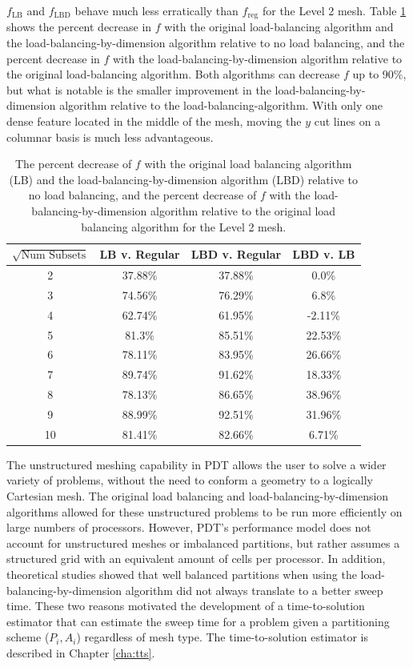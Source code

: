 $f_\text{LB}$ and $f_\text{LBD}$ behave much less erratically than $f_\text{reg}$ for the Level 2 mesh.
Table \ref{level2_metric_improvement} shows the percent decrease in $f$ with the original load-balancing algorithm and the load-balancing-by-dimension algorithm relative to no load balancing, and the percent decrease in $f$ with the load-balancing-by-dimension algorithm relative to the original load-balancing algorithm.
Both algorithms can decrease $f$ up to 90\%, but what is notable is the smaller improvement in the load-balancing-by-dimension algorithm relative to the load-balancing-algorithm.
With only one dense feature located in the middle of the mesh, moving the $y$ cut lines on a columnar basis is much less advantageous.
\begin{table}[ht]
\centering
\caption{The percent decrease of $f$ with the original load balancing algorithm (LB) and the load-balancing-by-dimension algorithm (LBD) relative to no load balancing, and the percent decrease of $f$ with the load-balancing-by-dimension algorithm relative to the original load balancing algorithm for the Level 2 mesh.}
\label{level2_metric_improvement}
\begin{tabular}{c|c|c|c}
\textbf{$\sqrt{\text{Num Subsets}}$} & \bf LB v. Regular  & \bf LBD v. Regular & \bf LBD v. LB \\ \hline
2&37.88\%&37.88\%&0.0\%\\ \hline
3&74.56\%&76.29\%&6.8\%\\ \hline
4&62.74\%&61.95\%&-2.11\%\\ \hline
5&81.3\%&85.51\%&22.53\%\\ \hline
6&78.11\%&83.95\%&26.66\%\\ \hline
7&89.74\%&91.62\%&18.33\%\\ \hline
8&78.13\%&86.65\%&38.96\%\\ \hline
9&88.99\%&92.51\%&31.96\%\\ \hline
10&81.41\%&82.66\%&6.71\%
\end{tabular}
\end{table}

\FloatBarrier
The unstructured meshing capability in PDT allows the user to solve a wider variety of problems, without the need to conform a geometry to a logically Cartesian mesh.
The original load balancing and load-balancing-by-dimension algorithms allowed for these unstructured problems to be run more efficiently on large numbers of processors.
However, PDT's performance model does not account for unstructured meshes or imbalanced partitions, but rather assumes a structured grid with an equivalent amount of cells per processor.
In addition, theoretical studies showed that well balanced partitions when using the load-balancing-by-dimension algorithm did not always translate to a better sweep time.
These two reasons motivated the development of a time-to-solution estimator that can estimate the sweep time for a problem given a partitioning scheme ($P_i, A_i$) regardless of mesh type. The time-to-solution estimator is described in Chapter \ref{cha:tts}.

